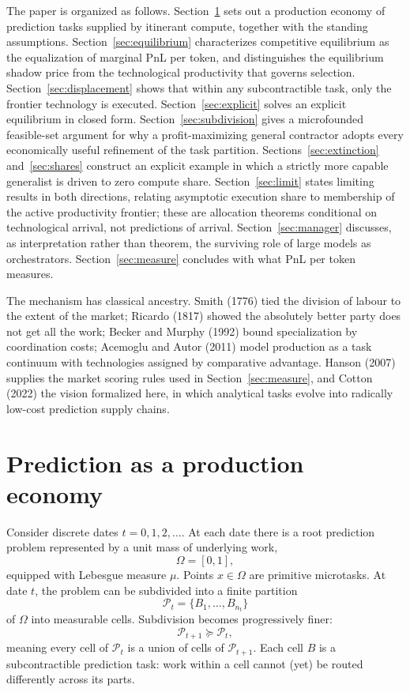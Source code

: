 \documentclass[11pt]{article}
\theoremstyle{definition}
\theoremstyle{remark}
\begin{document}
The paper is organized as follows. Section~\ref{sec:economy} sets out a production economy of prediction tasks supplied by itinerant compute, together with the standing assumptions. Section~\ref{sec:equilibrium} characterizes competitive equilibrium as the equalization of marginal PnL per token, and distinguishes the equilibrium shadow price from the technological productivity that governs selection. Section~\ref{sec:displacement} shows that within any subcontractible task, only the frontier technology is executed. Section~\ref{sec:explicit} solves an explicit equilibrium in closed form. Section~\ref{sec:subdivision} gives a microfounded feasible-set argument for why a profit-maximizing general contractor adopts every economically useful refinement of the task partition. Sections~\ref{sec:extinction} and~\ref{sec:shares} construct an explicit example in which a strictly more capable generalist is driven to zero compute share. Section~\ref{sec:limit} states limiting results in both directions, relating asymptotic execution share to membership of the active productivity frontier; these are allocation theorems conditional on technological arrival, not predictions of arrival. Section~\ref{sec:manager} discusses, as interpretation rather than theorem, the surviving role of large models as orchestrators. Section~\ref{sec:measure} concludes with what PnL per token measures.

The mechanism has classical ancestry. Smith (1776) tied the division of labour to the extent of the market; Ricardo (1817) showed the absolutely better party does not get all the work; Becker and Murphy (1992) bound specialization by coordination costs; Acemoglu and Autor (2011) model production as a task continuum with technologies assigned by comparative advantage. Hanson (2007) supplies the market scoring rules used in Section~\ref{sec:measure}, and Cotton (2022) the vision formalized here, in which analytical tasks evolve into radically low-cost prediction supply chains.

\section{Prediction as a production economy}
\label{sec:economy}

Consider discrete dates $t = 0, 1, 2, \ldots$. At each date there is a root prediction problem represented by a unit mass of underlying work,
\begin{equation}
\Omega = [0,1],
\end{equation}
equipped with Lebesgue measure $\mu$. Points $x \in \Omega$ are primitive microtasks. At date $t$, the problem can be subdivided into a finite partition
\begin{equation}
\mathcal{P}_t = \{B_1, \ldots, B_{n_t}\}
\end{equation}
of $\Omega$ into measurable cells. Subdivision becomes progressively finer:
\begin{equation}
\mathcal{P}_{t+1} \succcurlyeq \mathcal{P}_t,
\end{equation}
meaning every cell of $\mathcal{P}_t$ is a union of cells of $\mathcal{P}_{t+1}$. Each cell $B$ is a subcontractible prediction task: work within a cell cannot (yet) be routed differently across its parts.
\end{document}
